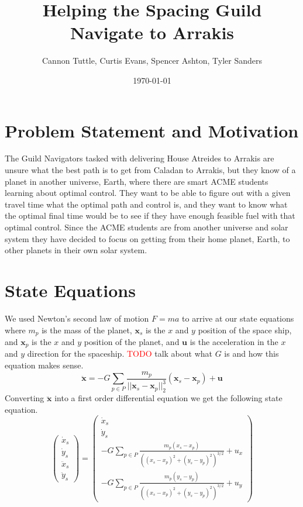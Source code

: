 \documentclass[11pt]{amsart}
\begin{document}
\title{Helping the Spacing Guild Navigate to Arrakis}
\author{Cannon Tuttle, Curtis Evans, Spencer Ashton, Tyler Sanders}

\date{\today}

\begin{abstract}
    
\end{abstract}

\maketitle

\section{Problem Statement and Motivation}
The Guild Navigators tasked with delivering House Atreides to Arrakis are unsure what the best path is to get from Caladan to Arrakis, but they know of a planet in another universe, Earth, where there 
are smart ACME students learning about optimal control. They want to be able to figure out with a given travel time what the optimal path and control is, and they want to know what the optimal final time 
would be to see if they have enough feasible fuel with that optimal control. Since the ACME students are from another universe and solar system they have decided to focus on getting from their home planet, 
Earth, to other planets in their own solar system. 

\section{State Equations}
We used Newton's second law of motion $F=ma$ to arrive at our state equations where $m_p$ is the mass of the planet, $\mathbf{x}_s$ is the $x$ and $y$ position of the space ship, and $\mathbf{x}_p$ is the $x$
and $y$ position of the planet, and $\mathbf{u}$ is the acceleration in the $x$ and $y$ direction for the spaceship. \textcolor{red}{TODO} talk about what $G$ is and how this equation makes sense.
\[\ddot{\mathbf{x}} = -G\sum_{p\in{P}}^{}\frac{m_p}{||\mathbf{x}_s-\mathbf{x}_p||_2^3}(\mathbf{x}_s-\mathbf{x}_p) + \mathbf{u}\]
Converting $\ddot{\mathbf{x}}$ into a first order differential equation we get the following state equation. 
\[\begin{pmatrix}
    \dot{x}_s \\
    \dot{y}_s \\
    \ddot{x}_s\\
    \ddot{y}_s 
\end{pmatrix} = \begin{pmatrix}
    \dot{x}_s \\
    \dot{y}_s \\
    -G\sum_{p\in{P}}^{}\frac{m_p(x_s - x_p)}{((x_s-x_p)^2+(y_s-y_p)^2)^{3/2}} + u_x \\
    -G\sum_{p\in{P}}^{}\frac{m_p(y_s - y_p)}{((x_s-x_p)^2+(y_s-y_p)^2)^{3/2}} + u_y
\end{pmatrix}\]
\end{document}
